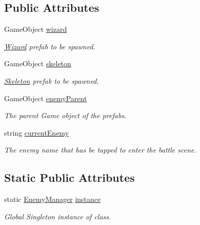 \subsection*{Public Attributes}
\begin{DoxyCompactItemize}
\item 
Game\+Object \mbox{\hyperlink{class_enemy_manager_ad5167208aff00ff86822bdc4d723aaad}{wizard}}
\begin{DoxyCompactList}\small\item\em \mbox{\hyperlink{class_wizard}{Wizard}} prefab to be spawned. \end{DoxyCompactList}\item 
Game\+Object \mbox{\hyperlink{class_enemy_manager_a986d0a001378a0d35579cd956138b601}{skeleton}}
\begin{DoxyCompactList}\small\item\em \mbox{\hyperlink{class_skeleton}{Skeleton}} prefab to be spawned. \end{DoxyCompactList}\item 
Game\+Object \mbox{\hyperlink{class_enemy_manager_a21f4d33210514d104e7a3ee0fe839a59}{enemy\+Parent}}
\begin{DoxyCompactList}\small\item\em The parent Game object of the prefabs. \end{DoxyCompactList}\item 
string \mbox{\hyperlink{class_enemy_manager_a1cef1d17733d1be85f5c266371566caf}{current\+Enemy}}
\begin{DoxyCompactList}\small\item\em The enemy name that has be tapped to enter the battle scene. \end{DoxyCompactList}\end{DoxyCompactItemize}
\subsection*{Static Public Attributes}
\begin{DoxyCompactItemize}
\item 
static \mbox{\hyperlink{class_enemy_manager}{Enemy\+Manager}} \mbox{\hyperlink{class_enemy_manager_ae75fbb59ff35752dfbf65f6e6ae633a5}{instance}}
\begin{DoxyCompactList}\small\item\em Global Singleton instance of class. \end{DoxyCompactList}\end{DoxyCompactItemize}
